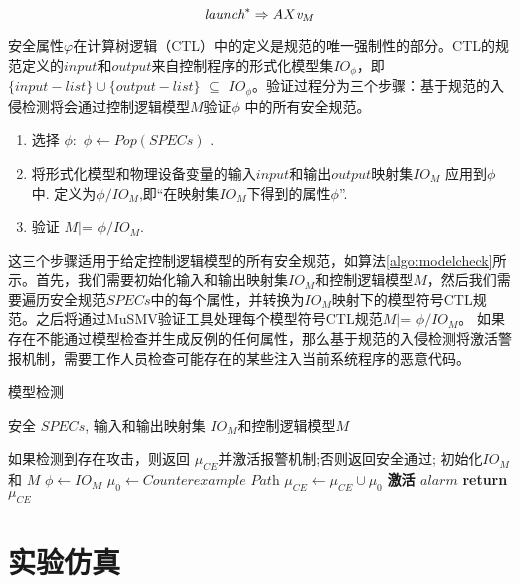 \[\raggedright
\textit{launch}^{*}\Rightarrow AX \textit{v}_{M}
\]

安全属性\textit {$ \varphi {} $}在计算树逻辑（CTL）中的定义是规范的唯一强制性的部分。CTL的规范定义的$ input $和$ output $来自控制程序的形式化模型集$ IO_\phi $，即$ \{input-list\} \cup{}  \{output-list\}$
$\subseteq{}$ \textit{$IO_\phi$}。验证过程分为三个步骤：基于规范的入侵检测将会通过控制逻辑模型$ M $验证\textit{$\phi{}$ }中的所有安全规范。
\begin{enumerate}
	\item 选择 $\phi$:~$\phi \leftarrow Pop(SPECs)$ .
	\item 将形式化模型和物理设备变量的输入$input$和输出$output$映射集$IO_{M}$ 应用到$\phi$中. 定义为$\phi/IO_M$,即“在映射集$IO_M$下得到的属性$\phi$”.
	\item 验证 $M \vert{}$= \textit{$\phi/IO_M$}.
\end{enumerate}

这三个步骤适用于给定控制逻辑模型的所有安全规范，如算法\ref{algo:modelcheck}所示。首先，我们需要初始化输入和输出映射集$ IO_M $和控制逻辑模型$ M $，然后我们需要遍历安全规范$ SPECs $中的每个属性，并转换为$ IO_M $映射下的模型符号CTL规范。之后将通过MuSMV验证工具处理每个模型符号CTL规范$M \vert{}$= \textit{$\phi/IO_M$}。 如果存在不能通过模型检查并生成反例的任何属性，那么基于规范的入侵检测将激活警报机制，需要工作人员检查可能存在的某些注入当前系统程序的恶意代码。

\begin{algorithm}[h]
\caption{模型检测}
\label{algo:modelcheck}
\begin{algorithmic}[1]
\Require %
安全 $SPECs$, 输入和输出映射集 $IO_M$和控制逻辑模型$M$ 

\Ensure %
如果检测到存在攻击，则返回 $\mu_{CE}$并激活报警机制;否则返回安全通过; 
\State 初始化$IO_M$ 和 $M$
\State $\phi \leftarrow IO_M$
\State $\mu_0 \leftarrow \textit{Counterexample Path}$
\State $\mu_{CE} \leftarrow \mu_{CE}\cup \mu_0$
\EndIf
\EndFor
{}
\State \textbf{激活} $alarm$
\EndIf
\State \textbf{return} $\mu_{CE}$

\end{algorithmic}
\end{algorithm}	

\section{实验仿真}
\label{sec:insertimage}


